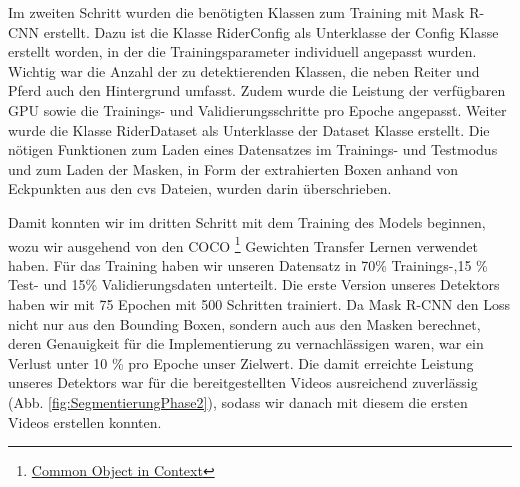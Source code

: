 Im zweiten Schritt wurden die benötigten Klassen zum Training mit Mask R-CNN erstellt. Dazu ist die Klasse RiderConfig als Unterklasse der Config Klasse erstellt worden, in der die Trainingsparameter individuell angepasst wurden. Wichtig war die Anzahl der zu detektierenden Klassen, die neben Reiter und Pferd auch den Hintergrund umfasst. Zudem wurde die Leistung der verfügbaren GPU sowie die Trainings- und Validierungsschritte pro Epoche angepasst. 
Weiter wurde die Klasse RiderDataset als Unterklasse der Dataset Klasse erstellt. Die nötigen Funktionen zum Laden eines Datensatzes im Trainings- und Testmodus und zum Laden der Masken, in Form der extrahierten Boxen anhand von Eckpunkten aus den cvs Dateien, wurden darin überschrieben.

Damit konnten wir im dritten Schritt mit dem Training des Models beginnen, wozu wir ausgehend von den COCO \footnote{\href{http://cocodataset.org/}{Common Object in Context}} Gewichten Transfer Lernen verwendet haben. Für das Training haben wir unseren Datensatz in 70\% Trainings-,15 \% Test- und 15\% Validierungsdaten unterteilt. Die erste Version unseres Detektors haben wir mit 75 Epochen mit 500 Schritten trainiert. Da Mask R-CNN den Loss nicht nur aus den Bounding Boxen, sondern auch aus den Masken berechnet, deren Genauigkeit für die Implementierung zu vernachlässigen waren, war ein Verlust unter 10 \% pro Epoche unser Zielwert. Die damit erreichte Leistung unseres Detektors war für die bereitgestellten Videos ausreichend zuverlässig (Abb. \ref{fig:SegmentierungPhase2}), sodass wir danach mit diesem die ersten Videos erstellen konnten.

